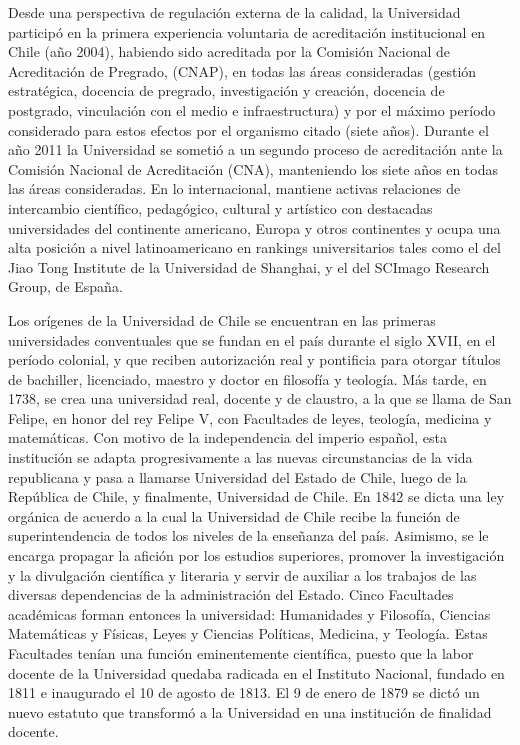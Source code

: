 Desde una perspectiva de regulación externa de la calidad, la Universidad participó en la
primera experiencia voluntaria de acreditación institucional en Chile (año 2004), habiendo sido
acreditada por la Comisión Nacional de Acreditación de Pregrado, (CNAP), en todas las áreas
consideradas (gestión estratégica, docencia de pregrado, investigación y creación, docencia de
postgrado, vinculación con el medio e infraestructura) y por el máximo período considerado
para estos efectos por el organismo citado (siete años). Durante el año 2011 la Universidad
se sometió a un segundo proceso de acreditación ante la Comisión Nacional de Acreditación
(CNA), manteniendo los siete años en todas las áreas consideradas. En lo internacional, mantiene
activas relaciones de intercambio científico, pedagógico, cultural y artístico con destacadas
universidades del continente americano, Europa y otros continentes y ocupa una alta posición
a nivel latinoamericano en rankings universitarios tales como el del Jiao Tong Institute de la
Universidad de Shanghai, y el del SCImago Research Group, de España.

Los orígenes de la Universidad de Chile se encuentran en las primeras universidades
conventuales que se fundan en el país durante el siglo XVII, en el período colonial, y que reciben
autorización real y pontificia para otorgar títulos de bachiller, licenciado, maestro y doctor en
filosofía y teología. Más tarde, en 1738, se crea una universidad real, docente y de claustro,
a la que se llama de San Felipe, en honor del rey Felipe V, con Facultades de leyes, teología,
medicina y matemáticas. Con motivo de la independencia del imperio español, esta institución
se adapta progresivamente a las nuevas circunstancias de la vida republicana y pasa a llamarse
Universidad del Estado de Chile, luego de la República de Chile, y finalmente, Universidad de
Chile. En 1842 se dicta una ley orgánica de acuerdo a la cual la Universidad de Chile recibe la
función de superintendencia de todos los niveles de la enseñanza del país. Asimismo, se le encarga
propagar la afición por los estudios superiores, promover la investigación y la divulgación científica
y literaria y servir de auxiliar a los trabajos de las diversas dependencias de la administración del
Estado. Cinco Facultades académicas forman entonces la universidad: Humanidades y Filosofía,
Ciencias Matemáticas y Físicas, Leyes y Ciencias Políticas, Medicina, y Teología. Estas Facultades
tenían una función eminentemente científica, puesto que la labor docente de la Universidad quedaba
radicada en el Instituto Nacional, fundado en 1811 e inaugurado el 10 de agosto de 1813. 
El 9 de enero de 1879 se dictó un nuevo estatuto
que transformó a la Universidad en una institución de finalidad docente.

